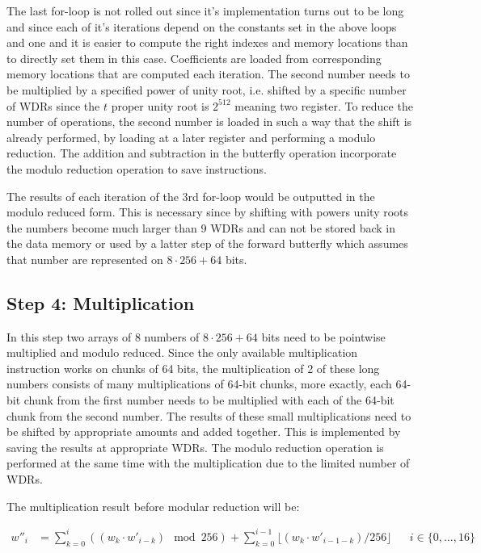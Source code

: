 The last for-loop is not rolled out since it's implementation turns out to be long and since each of it's iterations depend on the constants set in the above loops and one and it is easier to compute the right indexes and memory locations than to directly set them in this case. Coefficients are loaded from corresponding memory locations that are computed each iteration. The second number needs to be multiplied by a specified power of unity root, i.e. shifted by a specific number of WDRs since the $t$ proper unity root is $2^{512}$ meaning two register. To reduce the number of operations, the second number is loaded in such a way that the shift is already performed, by loading at a later register and performing a modulo reduction. The addition and subtraction in the butterfly operation incorporate the modulo reduction operation to save instructions. 

The results of each iteration of the 3rd for-loop would be outputted in the modulo reduced form. This is necessary since by shifting with powers unity roots the numbers become much larger than 9 WDRs and can not be stored back in the data memory or used by a latter step of the forward butterfly which assumes that number are represented on $8 \cdot 256 + 64$ bits.


\subsection{Step 4: Multiplication}

In this step two arrays of 8 numbers of $8 \cdot 256 + 64$ bits need to be pointwise multiplied and modulo reduced. Since the only available multiplication instruction works on chunks of 64 bits, the multiplication of 2 of these long numbers consists of many multiplications of 64-bit chunks, more exactly, each 64-bit chunk from the first number needs to be multiplied with each of the 64-bit chunk from the second number. The results of these small multiplications need to be shifted by appropriate amounts and added together. This is implemented by saving the results at appropriate WDRs. The modulo reduction operation is performed at the same time with the multiplication due to the limited number of WDRs.

The multiplication result before modular reduction will be:

\begin{align*}
  w''_i &= \sum_{k=0}^{i} ((w_k \cdot w'_{i - k}) \mod 256) + \sum_{k=0}^{i-1} \lfloor (w_k \cdot w'_{i - 1 - k}) / 256 \rfloor && i \in \{0, \ldots, 16\}
\end{align*}

